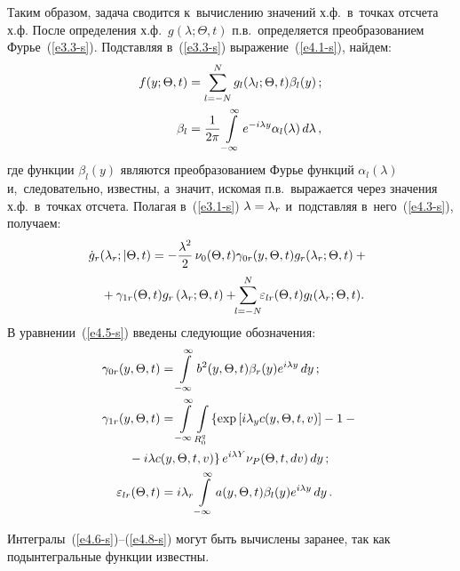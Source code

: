 \begin{multicols}{2}
Таким образом, задача сводится к~вычислению значений х.ф.\  
в~точках отсчета х.ф. После определения х.ф.\
$g(\lambda;\Theta,t)$ п.в.\ определяется преобразованием Фурье~(\ref{e3.3-s}). 
Подставляя в~(\ref{e3.3-s}) выражение~(\ref{e4.1-s}), найдем:
      \begin{align}
      f(y;\Theta, t) &= \sum\limits_{l=-N}^N g_l (\lambda_l ; \Theta, t) \beta_l (y)\,;
    \label{e4.3-s}
\\
     \beta_l &= \displaystyle\frac{\displaystyle 1\mathstrut}{\displaystyle 2\pi\mathstrut} \int\limits_{-\infty}^\infty e^{-i\lambda y} \alpha_l (\lambda)\, d\lambda\,,
     \notag
    \end{align}
где функции $\beta_l(y)$ являются преобразованием \mbox{Фурье} 
функций $\alpha_l(\lambda)$ и,~следовательно, известны,
а~значит, искомая п.в.\ выражается через значения х.ф.\ 
в~точках отсчета. Полагая в~(\ref{e3.1-s}) $\lambda\hm=\lambda_r$ 
и~подставляя в~него~(\ref{e4.3-s}), получаем:
    \begin{multline}
    \!\!\dot g_r (\lambda_r; |\Theta, t) = - 
    \fr{\lambda^2}{2}\, \nu_0 (\Theta,t) \gamma_{0r} (y,\Theta, t) g_r (\lambda_r; 
    \Theta, t) + {}\\
    {}+\gamma_{1r} (\Theta , t)g_r \left(\lambda_r;\Theta, t\right)+\!\!
     \sss_{l=-N}^N\!\! \varepsilon_{lr} (\Theta,t) g_l (\lambda_r;\Theta,t) .\!\!
    \label{e4.5-s}
    \end{multline}
В уравнении~(\ref{e4.5-s}) введены следующие обозначения:
  \begin{align}
  \gamma_{0r} (y,\Theta,t) &= 
    \iin b^2 (y,\Theta,t) \beta_r (y) e^{i\lambda y} \,dy\,;
    \label{e4.6-s}
    \\
 \gamma_{1r} (y,\Theta, t)& = \iin \iii_{R_0^q} \left\{ 
    \exp \left[ i\lambda_y c (y,\Theta, t,v)\right] -1-{}\right.\notag\\
&\hspace*{-10mm}\left.    {}- i\lambda 
    c (y,\Theta, t,v)\right\} e^{i\lambda Y} \nu_P (\Theta, t, dv)\,dy\,;
    \label{e4.7-s}
    \\
 \varepsilon_{lr} (\Theta ,t) &= i\lambda_r \iin a(y,\Theta, t) 
    \beta_l (y) e^{i\lambda y}\, dy\,.
    \label{e4.8-s}
    \end{align}

Интегралы~(\ref{e4.6-s})--(\ref{e4.8-s}) 
могут быть вычислены заранее, так как подынтегральные функции из\-вестны.


\end{multicols}
